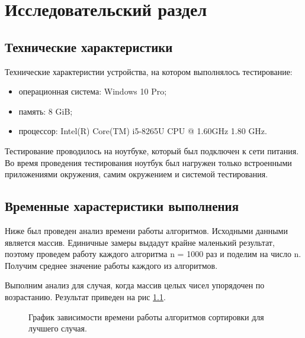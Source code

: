 \chapter{Исследовательский раздел}
\section{Технические характеристики}
Технические характеристии устройства, на котором выполнялось тестирование:
\begin{itemize}
	\item операционная система: Windows 10 Pro;
	\item память: 8 GiB;
	\item процессор: Intel(R) Core(TM) i5-8265U CPU @ 1.60GHz   1.80 GHz.
\end{itemize}
Тестирование проводилось на ноутбуке, который был подключен к сети питания. Во время проведения тестирования ноутбук был нагружен только встроенными приложениями окружения, самим окружением и системой тестирования.

\section{Временные харастеристики выполнения}
Ниже был проведен анализ времени работы алгоритмов. Исходными данными является массив. Единичные замеры выдадут крайне маленький результат, поэтому  проведем работу каждого алгоритма n = 1000 раз и поделим на число n. Получим среднее значение работы каждого из алгоритмов. 

Выполним анализ для случая, когда массив целых чисел упорядочен по возрастанию. Результат приведен на рис \ref{fg:ref1}.

\begin{figure}[H]
	\centering
	\caption{График зависимости времени работы алгоритмов сортировки для лучшего случая.} 
	\label{fg:ref1}
\end{figure} 

